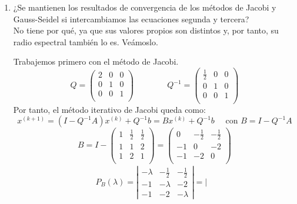 \begin{ejercicio}
\begin{enumerate}
        \item ¿Se mantienen los resultados de convergencia de los métodos de Jacobi y Gauss-Seidel si intercambiamos las ecuaciones segunda y tercera?\\

        No tiene por qué, ya que sus valores propios son distintos y, por tanto, su radio espectral también lo es. Veámoslo.

        Trabajemos primero con el método de Jacobi.
        $$Q=\left( \begin{array}{ccc}
            2 & 0 & 0 \\
            0 & 1 & 0 \\
            0 & 0 & 1 \\
        \end{array} \right)
        \qquad \qquad
        Q^{-1}=\left( \begin{array}{ccc}
            \frac{1}{2} & 0 & 0 \\
            0 & 1 & 0 \\
            0 & 0 & 1 \\
        \end{array} \right)
        $$
        Por tanto, el método iterativo de Jacobi queda como:
        $$x^{(k+1)} = (I-Q^{-1}A)x^{(k)} + Q^{-1}b 
        =Bx^{(k)} + Q^{-1}b
        \quad \text{ con } B=I-Q^{-1}A$$
        $$B=I-\left( \begin{array}{ccc}
            1 & \frac{1}{2} & \frac{1}{2} \\
            1 & 1 & 2 \\
            1 & 2 & 1 \\
        \end{array} \right)
        = \left( \begin{array}{ccc}
            0 & -\frac{1}{2} & -\frac{1}{2} \\
            -1 & 0 & -2 \\
            -1 & -2 & 0 \\
        \end{array} \right)$$
        \begin{multline*}
            P_B(\lambda)=
            \left|\begin{array}{ccc}
                -\lambda & -\frac{1}{2} & -\frac{1}{2} \\
                -1 & -\lambda & -2 \\
                -1 & -2 & -\lambda
            \end{array} \right|
            =\left|\begin{array}{ccc}

\end{array}
\end{multline*}
\end{enumerate}
\end{ejercicio}
